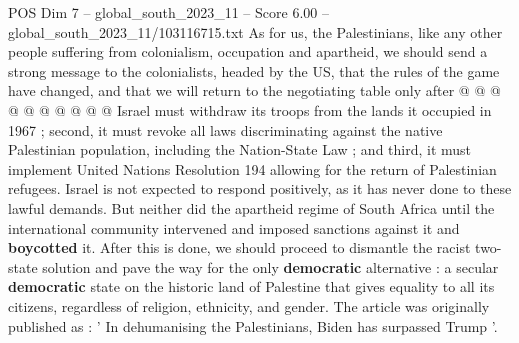 \begin{textsample}{POS Dim 7 – global\_south\_2023\_11 – Score 6.00 – global\_south\_2023\_11/103116715.txt}
As for us, the Palestinians, like any other people suffering from colonialism, occupation and apartheid, we should send a strong message to the colonialists, headed by the US, that the rules of the game have changed, and that we will return to the negotiating table only after @ @ @ @ @ @ @ @ @ @ Israel must withdraw its troops from the lands it occupied in 1967 ; second, it must revoke all laws discriminating against the native Palestinian population, including the Nation-State Law ; and third, it must implement United Nations Resolution 194 allowing for the return of Palestinian refugees.
Israel is not expected to respond positively, as it has never done to these lawful demands.
But neither did the apartheid regime of South Africa until the international community intervened and imposed sanctions against it and \textbf{boycotted} it.
After this is done, we should proceed to dismantle the racist two-state solution and pave the way for the only \textbf{democratic} alternative : a secular \textbf{democratic} state on the historic land of Palestine that gives equality to all its citizens, regardless of religion, ethnicity, and gender.
The article was originally published as : ' In dehumanising the Palestinians, Biden has surpassed Trump '.

\end{textsample}
